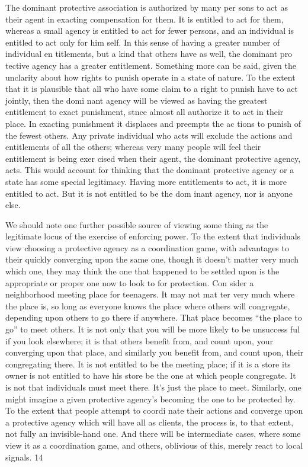 \documentclass[11pt,openany]{book}
\begin{document}
The dominant protective association is authorized by many per sons to act as their agent in exacting compensation for them. It is entitled to act for them, whereas a small agency is entitled to act for fewer persons, and an individual is entitled to act only for him self. In this sense of having a greater number of individual en titlements, but a kind that others have as well, the dominant pro tective agency has a greater entitlement. Something more can be said, given the unclarity about how rights to punish operate in a state of nature. To the extent that it is plausible that all who have some claim to a right to punish have to act jointly, then the domi nant agency will be viewed as having the greatest entitlement to exact punishment, stnce almost all authorize it to act in their place. In exacting punishment it displaces and preempts the ac tions to punish of the fewest others. Any private individual who acts will exclude the actions and entitlements of all the others; whereas very many people will feel their entitlement is being exer cised when their agent, the dominant protective agency, acts. This would account for thinking that the dominant protective agency or a state has some special legitimacy. Having more entitlements to act, it is more entitled to act. But it is not entitled to be the dom inant agency, nor is anyone else. 

We should note one further possible source of viewing some thing as the legitimate locus of the exercise of enforcing power. To the extent that individuals view choosing a protective agency as a coordination game, with advantages to their quickly converging upon the same one, though it doesn't matter very much which one, they may think the one that happened to be settled upon is the appropriate or proper one now to look to for protection. Con sider a neighborhood meeting place for teenagers. It may not mat ter very much where the place is, so long as everyone knows the place where others will congregate, depending upon others to go there if anywhere. That place becomes ``the place to go'' to meet others. It is not only that you will be more likely to be unsuccess ful if you look elsewhere; it is that others benefit from, and count upon, your converging upon that place, and similarly you benefit from, and count upon, their congregating there. It is not entitled to be the meeting place; if it is a store its owner is not entitled to have his store be the one at which people congregate. It is not that individuals must meet there. It's just the place to meet. Similarly, one might imagine a given protective agency's becoming the one to be protected by. To the extent that people attempt to coordi nate their actions and converge upon a protective agency which will have all as clients, the process is, to that extent, not fully an invisible-hand one. And there will be intermediate cases, where some view it as a coordination game, and others, oblivious of this, merely react to local signals. 14 
\end{document}

